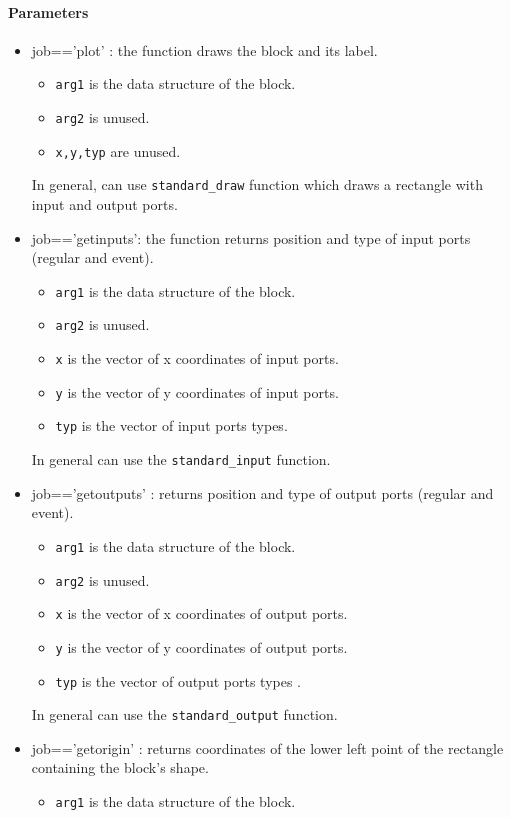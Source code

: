 \paragraph{Parameters}
\begin{itemize}
\item job=='plot' : the function draws the block and its label. 
  \begin{itemize}
  \item {\tt arg1} is the data structure of the block.
  \item {\tt arg2} is unused.
  \item {\tt x,y,typ} are unused.
  \end{itemize}
In general, can use {\tt standard\_draw} function which  draws a rectangle with
  input and output ports. 
\item job=='getinputs': the function returns position and type of
  input ports (regular and event). 
  \begin{itemize}
  \item  {\tt arg1} is the data structure of the block.
  \item  {\tt arg2} is unused.
  \item {\tt x} is the vector of x coordinates of input ports.
  \item {\tt y} is the vector of y coordinates of input ports.
  \item {\tt typ} is the vector of input ports types.
  \end{itemize}
  In general can use the {\tt standard\_input} function.
\item job=='getoutputs' : returns position and type of output ports
  (regular and event).
  \begin{itemize}
  \item  {\tt arg1} is the data structure of the block. 
  \item  {\tt arg2} is unused.
  \item {\tt x} is the vector of x coordinates of output ports.
  \item {\tt y} is the vector of y coordinates of output ports.
  \item {\tt typ} is the vector of output ports types .
  \end{itemize}
In general can use the {\tt standard\_output} function.
\item job=='getorigin'  : returns coordinates of the lower
  left point of the rectangle containing the block's shape.
  \begin{itemize}
  \item  {\tt arg1} is the data structure of the block. 

\end{itemize}
\end{itemize}

